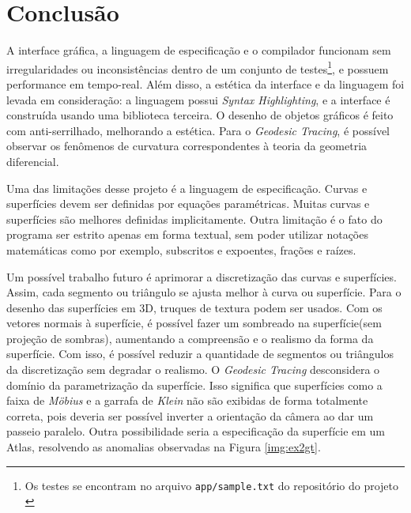\chapter{Conclusão}

A interface gráfica, a linguagem de especificação e o compilador
funcionam sem irregularidades ou inconsistências dentro de um conjunto de testes\footnote{Os testes se encontram no arquivo \texttt{app/sample.txt} do repositório do projeto \cite{TCC}},
e possuem performance em tempo-real.
Além disso, a estética da interface e da linguagem foi levada em consideração:
a linguagem possui \textit{Syntax Highlighting}, e a interface é construída usando uma biblioteca
terceira. O desenho de objetos gráficos é feito com anti-serrilhado, melhorando a estética.
Para o \textit{Geodesic Tracing}, é possível observar os fenômenos de curvatura
correspondentes à teoria da geometria diferencial.

Uma das limitações desse projeto é a linguagem de especificação.
Curvas e superfícies devem ser definidas por equações paramétricas.
Muitas curvas e superfícies são melhores definidas implicitamente.
Outra limitação é o fato do programa ser estrito apenas em forma textual, sem poder utilizar
notações matemáticas como por exemplo, subscritos e expoentes, frações e raízes.

Um possível trabalho futuro é aprimorar a discretização das curvas e superfícies.
Assim, cada segmento ou triângulo se ajusta melhor à curva ou superfície.
Para o desenho das superfícies em 3D, truques de textura podem ser usados.
Com os vetores normais à superfície, é possível fazer um sombreado na superfície(sem projeção de sombras),
aumentando a compreensão e o realismo da forma da superfície.
Com isso, é possível reduzir a quantidade de segmentos ou triângulos da discretização
sem degradar o realismo.
O \textit{Geodesic Tracing} desconsidera o domínio da parametrização da superfície.
Isso significa que superfícies como a faixa de \textit{M\"obius} e a garrafa de \textit{Klein}
não são exibidas de forma totalmente correta, pois deveria ser possível inverter a orientação da câmera
ao dar um passeio paralelo.
Outra possibilidade seria a especificação da superfície em um Atlas,
resolvendo as anomalias observadas na Figura \ref{img:ex2gt}.